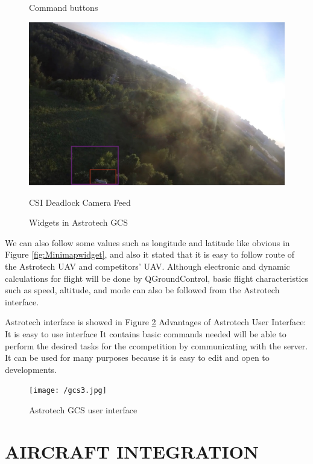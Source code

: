 \documentclass[12pt]{article}
\begin{document}
\begin{figure}[]
\begin{minipage}[b]{0.6\textwidth}
        \caption{Command buttons}
         \includegraphics[width = \textwidth]{gcs5.jpg}
        \caption{CSI Deadlock Camera Feed}
     \end{minipage}
     \hfill
     
     \caption{Widgets in Astrotech GCS}
    \label{fig:three graphs}
\end{figure}

\justify
We can also follow some values such as longitude and latitude like obvious in Figure \ref{fig:Minimapwidget}, and also it stated that it is easy to follow route of the Astrotech UAV and competitors’ UAV.
\justify
\justify
Although electronic and dynamic calculations for flight will be done by QGroundControl, basic flight characteristics such as speed, altitude, and mode can also be followed from the Astrotech interface.

\justify
Astrotech interface is showed in Figure \ref{fig:in_veh_com} Advantages of Astrotech User Interface:
It is easy to use interface
It contains basic commands needed will be able to perform the desired tasks for the ccompetition by communicating with the server.
It can be used for many purposes because it is easy to edit and open to developments.
\FloatBarrier

\begin{figure}[ht]
 	\centering
 	\texttt{[image: /gcs3.jpg]}
 	\caption{Astrotech GCS user interface}
        \label{fig:in_veh_com}
 \end{figure}
\FloatBarrier

\section{AIRCRAFT INTEGRATION}
\end{document}
